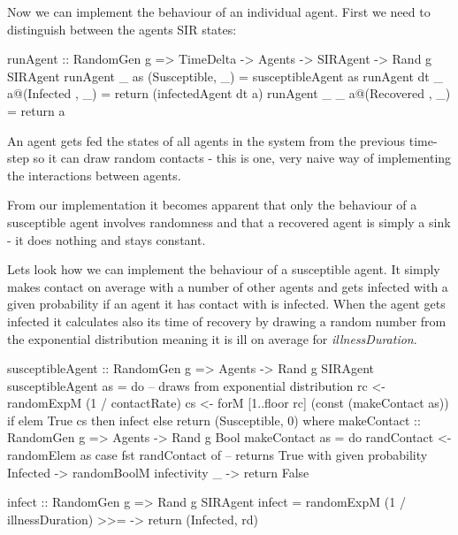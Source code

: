 Now we can implement the behaviour of an individual agent. First we need to distinguish between the agents SIR states:

\begin{HaskellCode}
runAgent :: RandomGen g 
  => TimeDelta -> Agents -> SIRAgent -> Rand g SIRAgent
runAgent _  as   (Susceptible, _) = susceptibleAgent as
runAgent dt _  a@(Infected   , _) = return (infectedAgent dt a)
runAgent _  _  a@(Recovered  , _) = return a
\end{HaskellCode}

An agent gets fed the states of all agents in the system from the previous time-step so it can draw random contacts - this is one, very naive way of implementing the interactions between agents. 

From our implementation it becomes apparent that only the behaviour of a susceptible agent involves randomness and that a recovered agent is simply a sink - it does nothing and stays constant.

Lets look how we can implement the behaviour of a susceptible agent. It simply makes contact on average with a number of other agents and gets infected with a given probability if an agent it has contact with is infected.
When the agent gets infected it calculates also its time of recovery by drawing a random number from the exponential distribution meaning it is ill on average for \textit{illnessDuration}.

\begin{HaskellCode}
susceptibleAgent :: RandomGen g => Agents -> Rand g SIRAgent
susceptibleAgent as = do
    -- draws from exponential distribution
    rc <- randomExpM (1 / contactRate) 
    cs <- forM [1..floor rc] (const (makeContact as))
    if elem True cs
      then infect
      else return (Susceptible, 0)
  where
    makeContact :: RandomGen g => Agents -> Rand g Bool
    makeContact as = do
      randContact <- randomElem as
      case fst randContact of
        -- returns True with given probability 
        Infected -> randomBoolM infectivity 
        _        -> return False

    infect :: RandomGen g => Rand g SIRAgent
    infect = randomExpM (1 / illnessDuration) 
               >>= \rd -> return (Infected, rd)
\end{HaskellCode}

